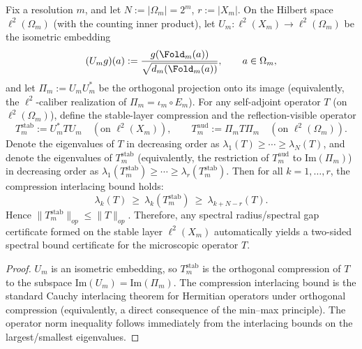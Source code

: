 \begin{proposition}\label{prop:fold-audit-spectral-interlacing}
Fix a resolution \(m\), and let \(N:=|\Omega_m|=2^m\), \(r:=|X_m|\).
On the Hilbert space \(\ell^2(\Omega_m)\) (with the counting inner product), let \(U_m:\ell^2(X_m)\to \ell^2(\Omega_m)\) be the isometric embedding
\[
(U_m g)(a):=\frac{g(\Fold_m(a))}{\sqrt{d_m(\Fold_m(a))}},\qquad a\in\Omega_m,
\]
and let \(\Pi_m:=U_mU_m^\ast\) be the orthogonal projection onto its image (equivalently, the \(\ell^2\)-caliber realization of \(\Pi_m=\iota_m\circ E_m\)).
For any self-adjoint operator \(T\) (on \(\ell^2(\Omega_m)\)), define the stable-layer compression and the reflection-visible operator
\[
T_m^{\mathrm{stab}}:=U_m^\ast T U_m\quad(\text{on }\ell^2(X_m)),
\qquad
T_m^{\mathrm{aud}}:=\Pi_m T \Pi_m\quad(\text{on }\ell^2(\Omega_m)).
\]
Denote the eigenvalues of \(T\) in decreasing order as \(\lambda_1(T)\ge\cdots\ge\lambda_N(T)\),
and denote the eigenvalues of \(T_m^{\mathrm{stab}}\) (equivalently, the restriction of \(T_m^{\mathrm{aud}}\) to \(\mathrm{Im}(\Pi_m)\)) in decreasing order as
\(\lambda_1(T_m^{\mathrm{stab}})\ge\cdots\ge\lambda_r(T_m^{\mathrm{stab}})\).
Then for all \(k=1,\dots,r\), the compression interlacing bound holds:
\[
\boxed{\;
\lambda_k(T)\ \ge\ \lambda_k(T_m^{\mathrm{stab}})\ \ge\ \lambda_{k+N-r}(T).
\;}
\]
Hence \(\|T_m^{\mathrm{stab}}\|_{op}\le \|T\|_{op}\).
Therefore, any spectral radius/spectral gap certificate formed on the stable layer \(\ell^2(X_m)\) automatically yields a two-sided spectral bound certificate for the microscopic operator \(T\).
\end{proposition}
\begin{proof}
\(U_m\) is an isometric embedding, so \(T_m^{\mathrm{stab}}\) is the orthogonal compression of \(T\) to the subspace \(\mathrm{Im}(U_m)=\mathrm{Im}(\Pi_m)\).
The compression interlacing bound is the standard Cauchy interlacing theorem for Hermitian operators under orthogonal compression (equivalently, a direct consequence of the min--max principle).
The operator norm inequality follows immediately from the interlacing bounds on the largest/smallest eigenvalues. \qedhere
\end{proof}

